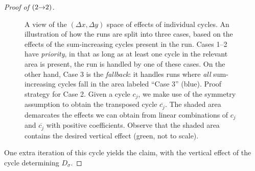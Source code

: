 \begin{proof}[Proof of  $({2}{\rightarrow}{2})$]
\begin{figure}[h]
\caption{
    A view of the $(\Delta x, \Delta y)$ space of effects of individual cycles.
    \figleft An illustration of how the runs are split into
    three cases, based on the effects of the sum-increasing cycles
    present in the run.
    Cases 1--2 have \emph{priority}, in that as long as at least one
    cycle in the relevant area is present, the run is handled
    by one of these cases. On the other hand,
    Case 3 is the \emph{fallback}: it handles runs where
    \emph{all} sum-increasing cycles fall in the area labeled ``Case 3'' (blue).
    \figright Proof strategy for Case 2.
    Given a cycle $c_j$, we make use of the symmetry assumption
    to obtain the transposed cycle $\overline{c_j}$.
    The shaded area demarcates the effects we can obtain from linear
    combinations of $c_j$ and $\overline{c_j}$ with positive coefficients.
    Observe that the shaded area contains the desired vertical effect
    (green, not to scale).
}
\label{fig:cases}
\end{figure}

One extra iteration of this cycle yields the claim, with the vertical effect
of the cycle determining $D_\sigma$.


\end{proof}
